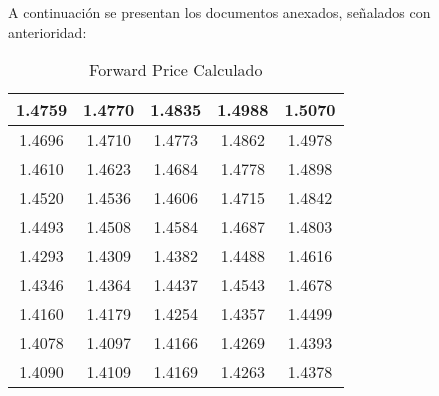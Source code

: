 A continuación se presentan los documentos anexados, señalados con anterioridad:
\newpage
\begin{table}                                
\centering                                   
\begin{tabular}{|c|c|c|c|c|}                 
\hline                                       
1.4759 & 1.4770 & 1.4835 & 1.4988 & 1.5070 \\
\hline                                       
1.4696 & 1.4710 & 1.4773 & 1.4862 & 1.4978 \\
\hline                                       
1.4610 & 1.4623 & 1.4684 & 1.4778 & 1.4898 \\
\hline                                       
1.4520 & 1.4536 & 1.4606 & 1.4715 & 1.4842 \\
\hline                                       
1.4493 & 1.4508 & 1.4584 & 1.4687 & 1.4803 \\
\hline                                       
1.4293 & 1.4309 & 1.4382 & 1.4488 & 1.4616 \\
\hline                                       
1.4346 & 1.4364 & 1.4437 & 1.4543 & 1.4678 \\
\hline                                       
1.4160 & 1.4179 & 1.4254 & 1.4357 & 1.4499 \\
\hline                                       
1.4078 & 1.4097 & 1.4166 & 1.4269 & 1.4393 \\
\hline                                       
1.4090 & 1.4109 & 1.4169 & 1.4263 & 1.4378 \\
\hline                                       
\end{tabular}                                
\caption{Forward Price Calculado}                     
\label{table:MyTableLabel}                   
\end{table}  

